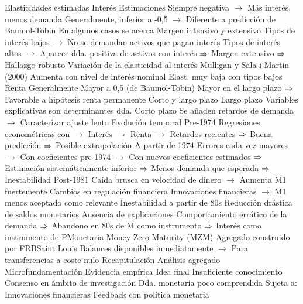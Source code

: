 \documentclass{nuevotema}
\begin{document}
\begin{esquemal}
		\2 Elasticidades estimadas
			\3 Interés
				\4 Estimaciones
				\4[] Siempre negativa
				\4[] $\to$ Más interés, menos demanda
				\4[] Generalmente, inferior a -0,5
				\4[] $\to$ Diferente a predicción de Baumol-Tobin
				\4[] En algunos casos se acerca
				\4 Margen intensivo y extensivo
				\4[] Tipos de interés bajos
				\4[] $\to$ No se demandan activos que pagan interés
				\4[] Tipos de interés altos
				\4[] $\to$ Aparece dda. positiva de activos con interés
				\4[] $\Rightarrow$ Margen extensivo
				\4[] $\Rightarrow$ Hallazgo robusto
				\4 Variación de la elasticidad al interés
				\4[] Mulligan y Sala-i-Martin (2000)
				\4[] Aumenta con nivel de interés nominal
				\4[] Elast. muy baja con tipos bajos
			\3 Renta
				\4 Generalmente
				\4[] Mayor a 0,5 (de Baumol-Tobin)
				\4[] Mayor en el largo plazo
				\4[] $\Rightarrow$ Favorable a hipótesis renta permanente
			\3 Corto y largo plazo
				\4 Largo plazo
				\4[] Variables explicativas son determinantes dda.
				\4 Corto plazo
				\4[] Se añaden retardos de demanda
				\4[] $\to$ Caracterizar ajuste lento
			\3 Evolución temporal
				\4 Pre-1974
				\4[] Regresiones econométricas con
				\4[] $\to$ Interés
				\4[] $\to$ Renta
				\4[] $\to$ Retardos recientes
				\4[] $\Rightarrow$ Buena predicción
				\4[] $\Rightarrow$ Posible extrapolación
				\4 A partir de 1974
				\4[] Errores cada vez mayores
				\4[] $\to$ Con coeficientes pre-1974
				\4[] $\to$ Con nuevos coeficientes estimados
				\4[] $\Rightarrow$ Estimación sistemáticamente inferior
				\4[] $\Rightarrow$ Menos demanda que esperada
				\4[] $\Rightarrow$ Inestabilidad
				\4 Post-1981
				\4[] Caída brusca en velocidad de dinero
				\4[] $\to$ Aumenta M1 fuertemente
				\4[] Cambios en regulación financiera
				\4[] Innovaciones financieras
				\4[] $\to$ M1 menos aceptado como relevante
				\4 Inestabilidad a partir de 80s
				\4[] Reducción drástica de saldos monetarios
				\4[] Ausencia de explicaciones
				\4[] Comportamiento errático de la demanda
				\4[] $\Rightarrow$ Abandono en 80s de M como instrumento
				\4[] $\Rightarrow$ Interés como instrumento de PMonetaria
				\4 Money Zero Maturity (MZM)
				\4[] Agregado construido por FRBSaint Louis
				\4[] Balances disponibles inmediatamente
				\4[] $\to$ Para transferencias a coste nulo
	\1[] 
		\2 Recapitulación
			\3 Análisis agregado
			\3 Microfundamentación
			\3 Evidencia empírica
		\2 Idea final
			\3 Insuficiente conocimiento
				\4 Consenso en ámbito de investigación
				\4 Dda. monetaria poco comprendida
				\4 Sujeta a:
				\4[] Innovaciones financieras
				\4[] Feedback con política monetaria

\end{esquemal}
\end{document}
